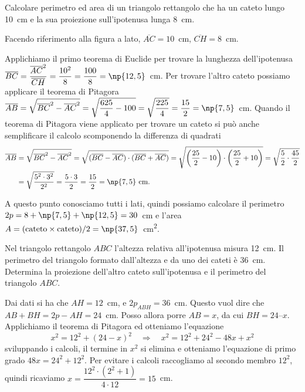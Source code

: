 \begin{exrig}
\begin{esempio}
Calcolare perimetro ed area di un triangolo rettangolo che ha un cateto lungo 10~cm e la sua proiezione sull'ipotenusa lunga 8~cm.\vspace{7pt}

Facendo riferimento alla figura a lato, $\overline{AC}=10$~cm, $\overline{CH}=8$~cm.

Applichiamo il primo teorema di Euclide per trovare la lunghezza dell'ipotenusa $\overline{BC}=\dfrac{\overline{AC}^2}{\overline{CH}}=\dfrac{10^2}{8}=\dfrac{100}{8}=\np{12,5}$~cm. Per trovare l'altro cateto possiamo applicare il teorema di Pitagora $\overline{AB}=\sqrt{\overline{BC}^2-\overline{AC}^2}=\sqrt{\dfrac{625}{4}-100}=\sqrt{\dfrac{225}{4}}=\dfrac{15}{2}=\np{7,5}$~cm.
Quando il teorema di Pitagora viene applicato per trovare un cateto si può anche semplificare il calcolo scomponendo la differenza di quadrati
\begin{align*}
\overline{AB}&=\sqrt{\overline{BC}^2-\overline{AC}^2}=\sqrt{(\overline{BC}-\overline{AC})\cdot(\overline{BC}+\overline{AC})}=\sqrt{\left(\dfrac{25}{2}-10\right)\cdot\left(\dfrac{25}{2}+10\right)}=\sqrt{\dfrac{5}{2}\cdot\dfrac{45}{2}}\\
&=\sqrt{\dfrac{5^2\cdot 3^2}{2^2}}=\dfrac{5\cdot 3}{2}=\dfrac{15}{2}=\np{7,5}\text{~cm.}
\end{align*}

A questo punto conosciamo tutti i lati, quindi possiamo calcolare il perimetro $2p=8+\np{7,5}+\np{12,5}=30$~cm e l'area $A=(\text{cateto}\times\text{cateto})/2 = \np{37,5}$~cm\textsuperscript{2}.
\end{esempio}

\begin{esempio}
Nel triangolo rettangolo $ABC$ l'altezza relativa all'ipotenusa misura 12~cm. Il perimetro del triangolo formato dall'altezza e da uno dei cateti è 36~cm. Determina la proiezione dell'altro cateto sull'ipotenusa e il perimetro del triangolo $ABC$.\vspace{7pt}

Dai dati si ha che $AH = 12$~cm, e $2p_{ABH} = 36$~cm.
Questo vuol dire che $AB + BH = 2p - AH = 24$~cm. 
Posso allora porre $AB = x$, da cui $BH = 24 – x$.
Applichiamo il teorema di Pitagora ed otteniamo l'equazione
\[x^2 = 12^2 + (24 - x)^2 \quad\Rightarrow\quad x^2 = 12^2 + 24^2 - 48x + x^2\]
sviluppando i calcoli, il termine in $x^2$ si elimina e otteniamo l'equazione di primo grado $48x = 24^2 + 12^2$.
Per evitare i calcoli raccogliamo al secondo membro $12^2$, quindi ricaviamo $x=\dfrac{12^2\cdot\left(2^2+1\right)}{4\cdot 12}=15$~cm.


\end{esempio}
\end{exrig}
